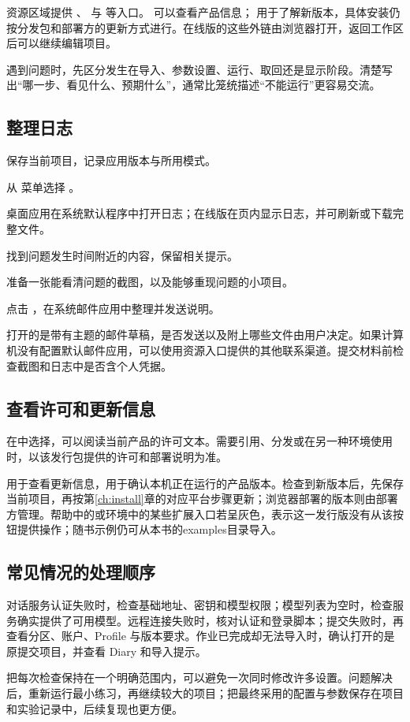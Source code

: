 资源区域提供 、 与  等入口。 可以查看产品信息； 用于了解新版本，具体安装仍按分发包和部署方的更新方式进行。在线版的这些外链由浏览器打开，返回工作区后可以继续编辑项目。

遇到问题时，先区分发生在导入、参数设置、运行、取回还是显示阶段。清楚写出“哪一步、看见什么、预期什么”，通常比笼统描述“不能运行”更容易交流。

\subsection{整理日志}

\begin{steps}
\item 保存当前项目，记录应用版本与所用模式。
\item 从  菜单选择 。
\item 桌面应用在系统默认程序中打开日志；在线版在页内显示日志，并可刷新或下载完整文件。
\item 找到问题发生时间附近的内容，保留相关提示。
\item 准备一张能看清问题的截图，以及能够重现问题的小项目。
\item 点击 ，在系统邮件应用中整理并发送说明。
\end{steps}

 打开的是带有主题的邮件草稿，是否发送以及附上哪些文件由用户决定。如果计算机没有配置默认邮件应用，可以使用资源入口提供的其他联系渠道。提交材料前检查截图和日志中是否含个人凭据。


\subsection{查看许可和更新信息}

在中选择，可以阅读当前产品的许可文本。需要引用、分发或在另一种环境使用时，以该发行包提供的许可和部署说明为准。

用于查看更新信息，用于确认本机正在运行的产品版本。检查到新版本后，先保存当前项目，再按第\ref{ch:install}章的对应平台步骤更新；浏览器部署的版本则由部署方管理。帮助中的或环境中的某些扩展入口若呈灰色，表示这一发行版没有从该按钮提供操作；随书示例仍可从本书的examples目录导入。


\subsection{常见情况的处理顺序}

对话服务认证失败时，检查基础地址、密钥和模型权限；模型列表为空时，检查服务确实提供了可用模型。远程连接失败时，核对认证和登录脚本；提交失败时，再查看分区、账户、Profile 与版本要求。作业已完成却无法导入时，确认打开的是原提交项目，并查看 Diary 和导入提示。

把每次检查保持在一个明确范围内，可以避免一次同时修改许多设置。问题解决后，重新运行最小练习，再继续较大的项目；把最终采用的配置与参数保存在项目和实验记录中，后续复现也更方便。
